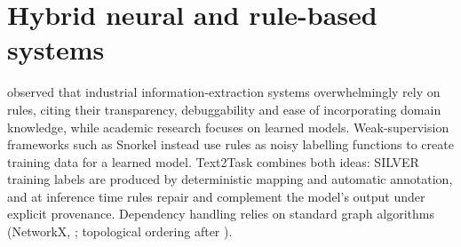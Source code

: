 \section{Hybrid neural and rule-based systems}
\citet{chiticariu2013rules} observed that industrial information-extraction systems overwhelmingly rely on rules, citing their transparency, debuggability and ease of incorporating domain knowledge, while academic research focuses on learned models. Weak-supervision frameworks such as Snorkel \citep{ratner2017snorkel} instead use rules as noisy labelling functions to create training data for a learned model. Text2Task combines both ideas: SILVER training labels are produced by deterministic mapping and automatic annotation, and at inference time rules repair and complement the model's output under explicit provenance. Dependency handling relies on standard graph algorithms (NetworkX, \citealp{hagberg2008networkx}; topological ordering after \citealp{kahn1962topological}).

